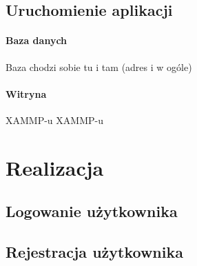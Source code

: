 \documentclass[a4paper, 12pt, oneside]{article}
\begin{document}
			\paragraph{}
		\subsection{Uruchomienie aplikacji}
			\paragraph{Baza danych}
				Baza chodzi sobie tu i tam (adres i w ogóle)
			\paragraph{Witryna}
				XAMMP-u XAMMP-u
\section{Realizacja}
	\subsection{Logowanie użytkownika}
	\subsection{Rejestracja użytkownika}
\end{document}
